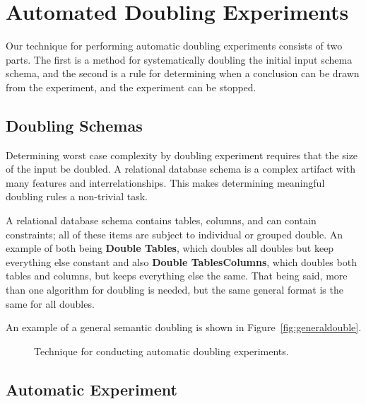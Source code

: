 \section{Automated Doubling Experiments}
  \label{sec:technique}

  Our technique for performing automatic doubling experiments consists
  of two parts.  The first is a method for systematically doubling 
  the initial input schema schema, and the second is a rule for determining
  when a conclusion can be drawn from the experiment, and the experiment can be stopped. 

  \subsection{Doubling Schemas}
  \label{subsec:doubling}

  Determining worst case complexity by doubling experiment requires that
  the size of the input be doubled. A relational database
  schema is a complex artifact with many features and interrelationships. 
  This makes determining meaningful doubling rules a non-trivial task.


  A relational database schema contains tables, columns, and can contain constraints; 
  all of these items are subject to individual or grouped double. An example of
  both being \textbf{Double Tables}, which doubles all doubles but keep
  everything else constant and also \textbf{Double TablesColumns}, which
  doubles both tables and columns, but keeps everything else the same. That 
  being said, more than one algorithm for doubling is needed, but the same 
  general format is the same for all doubles.

  An example of a general semantic doubling is shown in
  Figure~\ref{fig:generaldouble}.

  \begin{figure*}
    
    \caption{Technique for conducting automatic doubling experiments.}
    \label{fig:doublingexp}
  \end{figure*}

  \subsection{Automatic Experiment}
  \label{subsec:experiment}

